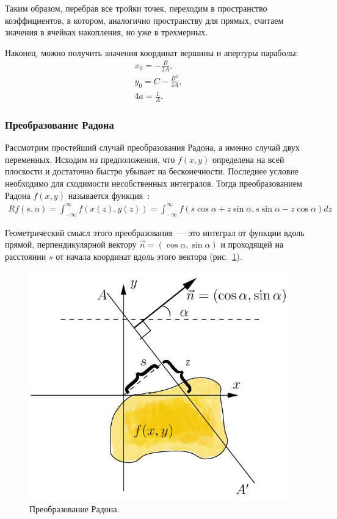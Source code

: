 \documentclass[12pt,a4paper]{article} %
\begin{document}
Таким образом, перебрав все тройки точек, переходим в пространство коэффициентов, в котором, аналогично пространству для прямых, считаем значения в ячейках накопления, но уже в трехмерных.

Наконец, можно получить значения координат вершины и апертуры параболы:
\begin{gather}\label{parab_equ_4}
	x_0 = -\frac{B}{2A},\\
	y_0 = C-\frac{B^2}{4A},\\
	4a=\frac{1}{A}.
\end{gather}


\subsubsection{Преобразование Радона}

Рассмотрим простейший случай преобразования Радона, а именно случай двух переменных. Исходим из предположения, что $f(x,y)$ определена на всей плоскости и достаточно быстро убывает на бесконечности. Последнее условие необходимо для сходимости несобственных интегралов. Тогда преобразованием Радона $f(x,y)$ называется функция~\cite{Radon}:
\begin{gather}\label{radon}
	Rf(s, \alpha) = \int_{-\infty}^{\infty}{f(x(z),y(z))} = \int_{-\infty}^{\infty}{f(s\cos{\alpha}+z\sin{\alpha}, s\sin{\alpha}-z\cos{\alpha})dz}
\end{gather}

Геометрический смысл этого преобразования~--- это интеграл от функции вдоль прямой, перпендикулярной вектору $\vec{n}=(\cos{\alpha}, \sin{\alpha})$ и проходящей на расстоянии $s$ от начала координат вдоль этого вектора (рис.~\ref{fig:Radon_transform}).
\begin{figure}[h]
	
	\centering
	
	\includegraphics[width=0.5\linewidth]{Radon_transform.jpg}
	
	\caption{Преобразование Радона.}
	
	\label{fig:Radon_transform}
	
\end{figure}
\end{document}
